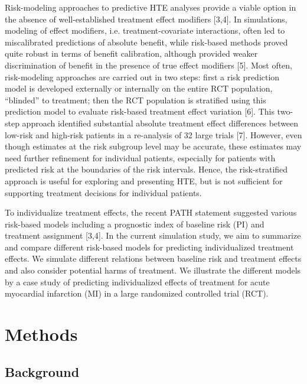\documentclass[]{elsarticle} %
\begin{document}
Risk-modeling approaches to predictive HTE analyses provide a viable
option in the absence of well-established treatment effect modifiers
{[}3,4{]}. In simulations, modeling of effect modifiers, i.e.
treatment-covariate interactions, often led to miscalibrated predictions
of absolute benefit, while risk-based methods proved quite robust in
terms of benefit calibration, although provided weaker discrimination of
benefit in the presence of true effect modifiers {[}5{]}. Most often,
risk-modeling approaches are carried out in two steps: first a risk
prediction model is developed externally or internally on the entire RCT
population, ``blinded'' to treatment; then the RCT population is
stratified using this prediction model to evaluate risk-based treatment
effect variation {[}6{]}. This two-step approach identified substantial
absolute treatment effect differences between low-risk and high-risk
patients in a re-analysis of 32 large trials {[}7{]}. However, even
though estimates at the risk subgroup level may be accurate, these
estimates may need further refinement for individual patients,
especially for patients with predicted risk at the boundaries of the
risk intervals. Hence, the risk-stratified approach is useful for
exploring and presenting HTE, but is not sufficient for supporting
treatment decisions for individual patients.

To individualize treatment effects, the recent PATH statement suggested
various risk-based models including a prognostic index of baseline risk
(PI) and treatment assignment {[}3,4{]}. In the current simulation
study, we aim to summarize and compare different risk-based models for
predicting individualized treatment effects. We simulate different
relations between baseline risk and treatment effects and also consider
potential harms of treatment. We illustrate the different models by a
case study of predicting individualized effects of treatment for acute
myocardial infarction (MI) in a large randomized controlled trial (RCT).

\hypertarget{methods}{%
\section{Methods}\label{methods}}

\hypertarget{background}{%
\subsection{Background}\label{background}}
\end{document}
